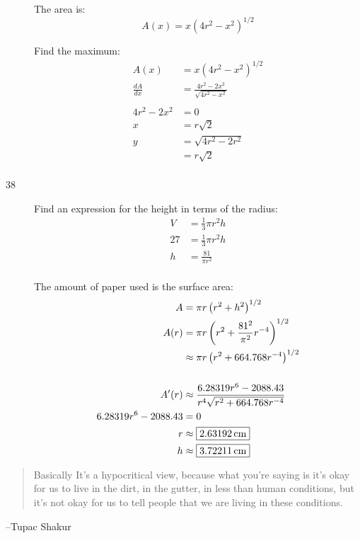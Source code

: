 \documentclass[letterpaper, landscape]{exam}
\begin{document}
\begin{description}
      The area is:
      \[
        A(x) = x (4r^2 - x^2)^{1/2}
      \]

      Find the maximum:
      \begin{align*}
        A(x)          & = x (4r^2 - x^2)^{1/2} \\
        \frac{dA}{dx} & = \frac{4r^2 - 2x^2}{\sqrt{4r^2 - x^2}} \\
        \\
        4r^2 - 2x^2 & = 0 \\
        x           & = r \sqrt{2} \\
        y           & = \sqrt{4r^2 - 2r^2} \\
                    & = r \sqrt{2} \\
      \end{align*}


    \newpage

    \item[38]
      Find an expression for the height in terms of the radius:
      \begin{align*}
        V  & = \frac{1}{3} \pi r^2 h \\
        27 & = \frac{1}{3} \pi r^2 h \\
        h  & = \frac{81}{\pi r^2} \\
      \end{align*}

      The amount of paper used is the surface area:
      \begin{align*}
        A                     & = \pi r \left( r^2 + h^2 \right)^{1/2} \\
        A(r)                  & = \pi r \left( r^2 + \frac{81^2}{\pi^2} r^{-4} \right)^{1/2} \\
                              & \approx \pi r \left( r^2 + 664.768 r^{-4} \right)^{1/2} \\
        \\
        A'(r)                 & \approx \frac{6.28319 r^6 - 2088.43}{r^4 \sqrt{r^2 + 664.768 r^{ - 4}}} \\
        6.28319 r^6 - 2088.43 & = 0 \\
        r                     & \approx \boxed{ \unit[2.63192]{cm} } \\
        h                     & \approx \boxed{ \unit[3.72211]{cm} } \\
      \end{align*}

  \end{description}

  \else
    \vspace{10 cm}
    \begin{quote}
      \begin{em}
        Basically It's a hypocritical view, because what you're saying is it's
        okay for us to live in the dirt, in the gutter, in less than human
        conditions, but it's not okay for us to tell people that we are living
        in these conditions.
      \end{em}
    \end{quote}
    \hspace{2 cm} --Tupac Shakur
  \fi
\end{document}

